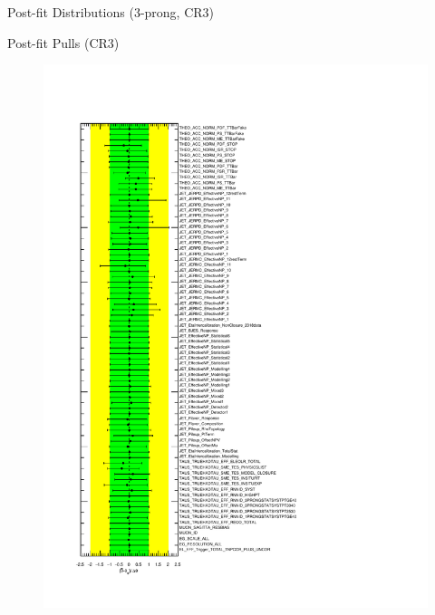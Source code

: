 \documentclass[aspectratio=46, dvipdfmx, 10pt, t]{beamer} %
\begin{document}
\begin{frame}{Post-fit Distributions (3-prong, CR3)}
\begin{figure}
  \end{figure}
\end{frame}

\begin{frame}{Post-fit Pulls (CR3)}
  \begin{figure}
    \includegraphics[scale=0.3]{pull_pulls_stGE500LT600}
  \end{figure}
\end{frame}
\end{document}
